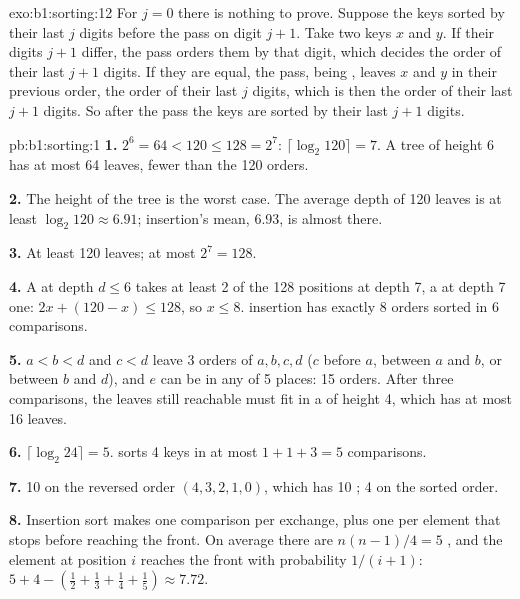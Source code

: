 \begin{solution}{exo:b1:sorting:12}
For $j = 0$ there is nothing to prove. Suppose the keys sorted by their last $j$ digits before the pass on digit $j + 1$.
Take two keys $x$ and $y$. If their digits $j + 1$ differ, the pass orders them by that digit, which decides the order of
their last $j + 1$ digits. If they are equal, the pass, being , leaves $x$ and $y$ in their previous order, the
order of their last $j$ digits, which is then the order of their last $j + 1$ digits. So after the pass the keys are
sorted by their last $j + 1$ digits.
\end{solution}

\begin{solution}{pb:b1:sorting:1}
\textbf{1.} $2^6 = 64 < 120 \leq 128 = 2^7$: $\lceil \log_2 120 \rceil = 7$. A tree of height 6 has at most 64 leaves,
fewer than the 120 orders.

\textbf{2.} The height of the tree is the worst case. The average depth of 120 leaves is at least $\log_2 120 \approx
6.91$;  insertion's mean, 6.93, is almost there.

\textbf{3.} At least 120 leaves; at most $2^7 = 128$.

\textbf{4.} A  at depth $d \leq 6$ takes at least 2 of the 128 positions at depth 7, a  at depth 7 one: $2x +
(120 - x) \leq 128$, so $x \leq 8$.  insertion has exactly 8 orders sorted in 6 comparisons.

\textbf{5.} $a < b < d$ and $c < d$ leave 3 orders of $a, b, c, d$ ($c$ before $a$, between $a$ and $b$, or between $b$ and
$d$), and $e$ can be in any of 5 places: 15 orders. After three comparisons, the leaves still reachable must fit in a
 of height 4, which has at most 16 leaves.

\textbf{6.} $\lceil \log_2 24 \rceil = 5$.  sorts 4 keys in at most $1 + 1 + 3 = 5$ comparisons.

\textbf{7.} 10 on the reversed order $(4, 3, 2, 1, 0)$, which has 10 ; 4 on the sorted order.

\textbf{8.} Insertion sort makes one comparison per exchange, plus one per element that stops before reaching the
front. On average there are $n(n - 1)/4 = 5$ , and the element at position $i$ reaches the front with
probability $1/(i + 1)$: $5 + 4 - (\frac12 + \frac13 + \frac14 + \frac15) \approx 7.72$.


\end{solution}
